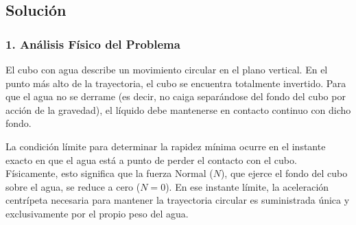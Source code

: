 \documentclass[12pt, a4paper]{article}
\begin{document}
\begin{center}
\end{center}

\subsection*{Solución}

\subsubsection*{1. Análisis Físico del Problema}
El cubo con agua describe un movimiento circular en el plano vertical. En el punto más alto de la trayectoria, el cubo se encuentra totalmente invertido. Para que el agua no se derrame (es decir, no caiga separándose del fondo del cubo por acción de la gravedad), el líquido debe mantenerse en contacto continuo con dicho fondo.

La condición límite para determinar la rapidez mínima ocurre en el instante exacto en que el agua está a punto de perder el contacto con el cubo. Físicamente, esto significa que la fuerza Normal ($N$), que ejerce el fondo del cubo sobre el agua, se reduce a cero ($N = 0$). En ese instante límite, la aceleración centrípeta necesaria para mantener la trayectoria circular es suministrada única y exclusivamente por el propio peso del agua.
\end{document}
